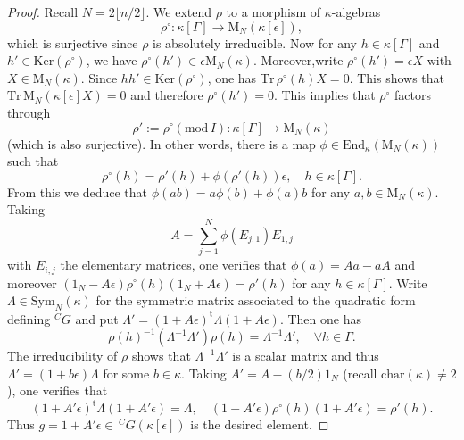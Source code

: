 \documentclass[12pt,oneside,reqno]{amsart}
\theoremstyle{plain}
\begin{document}
\begin{proof}
		
		
		
		
		
		
		Recall
		$N=2\lfloor n/2\rfloor$.
		We extend
		$\rho$
		to a morphism
		of $\kappa$-algebras
		\[
		\rho^\circ
		\colon
		\kappa[\Gamma]
		\rightarrow
		\mathrm{M}_N(\kappa[\epsilon]),
		\]
		which is surjective since
		$\rho$
		is absolutely irreducible.
		Now for any
		$h\in\kappa[\Gamma]$
		and
		$h'\in\mathrm{Ker}(\rho^\circ)$, we have
		$\rho^\circ(h')\in
		\epsilon
		\mathrm{M}_N(\kappa)$. Moreover,write $\rho^\circ(h')=\epsilon X$ with $X\in \mathrm{M}_N(\kappa)$. Since $hh'\in\mathrm{Ker}(\rho^\circ)$,
		one has
		$\mathrm{Tr}\,\rho^\circ(h)X=0$.
		This shows that
		$\mathrm{Tr}\,\mathrm{M}_N(\kappa[\epsilon]X)=0$
		and therefore
		$\rho^\circ(h')=0$.
		This implies that
		$\rho^\circ$
		factors through
		\[
		\rho':=\rho^\circ(\mathrm{mod}\,I)
		\colon
		\kappa[\Gamma]
		\rightarrow
		\mathrm{M}_N(\kappa)
		\]
		(which is also surjective).
		In other words,
		there is a map
		$\phi
		\in\mathrm{End}_\kappa(\mathrm{M}_N(\kappa))$
		such that
		\[
		\rho^\circ(h)
		=
		\rho'(h)
		+
		\phi(\rho'(h))\epsilon,
		\quad
		h\in
		\kappa[\Gamma].
		\]
		From this we deduce that
		$\phi(ab)=a\phi(b)+\phi(a)b$
		for any
		$a,b\in\mathrm{M}_N(\kappa)$.
		Taking
		\[
		A=\sum_{j=1}^N\phi(E_{j,1})E_{1,j}
		\]
		with
		$E_{i,j}$ the elementary matrices,
		one verifies that
		$\phi(a)=Aa-aA$
		and moreover
		$(1_N-A\epsilon)
		\rho^\circ(h)
		(1_N+A\epsilon)=\rho'(h)$
		for any
		$h\in
		\kappa[\Gamma]$.
		Write
		$\Lambda\in
		\mathrm{Sym}_N(\kappa)$
		for the symmetric matrix
		associated to the quadratic form
		defining
		$^CG$
		and put
		$\Lambda'=
		(1+A\epsilon)^\mathrm{t}
		\Lambda(1+A\epsilon)$.
		Then one has
		\[
		\rho(h)^{-1}(\Lambda^{-1}\Lambda')\rho(h)
		=
		\Lambda^{-1}\Lambda',
		\quad
		\forall
		h\in\Gamma.
		\]
		The irreducibility of $\rho$
		shows that
		$\Lambda^{-1}\Lambda'$
		is a scalar matrix and thus
		$\Lambda'=(1+b\epsilon)\Lambda$
		for some
		$b\in\kappa$.
		Taking
		$A'=A-(b/2)1_N$
		(recall $\mathrm{char}(\kappa)\ne2$),
		one verifies that
		\[
		(1+A'\epsilon)^\mathrm{t}\Lambda(1+A'\epsilon)=\Lambda,
		\quad
		(1-A'\epsilon)\rho^\circ(h)(1+A'\epsilon)=\rho'(h).
		\]
		Thus
		$g=1+A'\epsilon\in
		\,^CG(\kappa[\epsilon])$
		is the desired element.
	\end{proof}
	
	
	
\end{document}
